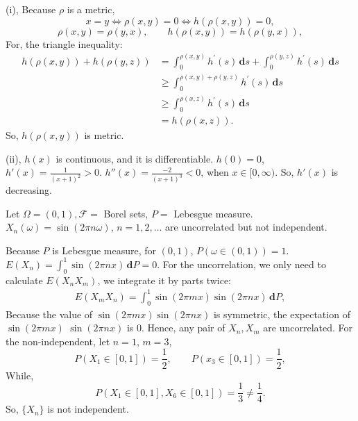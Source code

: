 \documentclass[en, normal, 11pt, black]{elegantnote}
\newenvironment{exercise}[1]{\begin{tcolorbox}[colback=black!15, colframe=black!80, breakable, title=#1]}{\end{tcolorbox}}
\renewenvironment{proof}{\begin{tcolorbox}[colback=white, colframe=black!50, breakable, title=Proof. ]\setlength{\parskip}{0.8em}}{\,\\\rightline{$\square$}\end{tcolorbox}}
\newcommand{\der}{\,\mathbf{d}}
\begin{document}
    \begin{proof}
        (i), Because $\rho$ is a metric, 
        \[
            x=y\Leftrightarrow\rho(x,y)=0\Leftrightarrow h(\rho(x,y))=0, 
        \]
        \[\rho(x,y)=\rho(y,x),\qquad h(\rho(x,y))=h(\rho(y,x)), \]
        For, the triangle inequality: 
        \[
            \begin{aligned}
            h(\rho(x, y))+h(\rho(y, z)) &=\int_{0}^{\rho(x, y)} h^{\prime}(s) \der s+\int_{0}^{\rho(y, z)} h^{\prime}(s) \der s \\
            & \geqslant \int_{0}^{\rho(x, y)+\rho(y, z)} h^{\prime}(s) \der s \\
            & \geqslant \int_{0}^{\rho(x, z)} h^{\prime}(s) \der s\\
            &=h(\rho(x, z)). 
            \end{aligned}
        \]
        So, $h(\rho(x,y))$ is metric. 

        (ii), $h(x)$ is continuous, and it is differentiable. $h(0)=0$, $h'(x)=\frac{1}{(x+1)^2}>0$. $h''(x)=\frac{-2}{(x+1)^3}<0$, when $x\in[0,\infty)$. So, $h'(x)$ is decreasing. 
    \end{proof}

    \begin{exercise}{2.1.4}
        Let $\Omega=(0,1), \mathcal{F}=$ Borel sets, $P=$ Lebesgue measure. $X_{n}(\omega)=\sin (2 \pi n \omega)$, $n=1,2, \ldots$ are uncorrelated but not independent. 
    \end{exercise}

    \begin{proof}
        Because $P$ is Lebesgue measure, for $(0,1)$, $P(\omega\in(0,1))=1$. $E(X_n)=\int_0^1\sin(2\pi n x)\der P=0$. 
        For the uncorrelation, we only need to calculate $E(X_nX_m)$, we integrate it by parts twice: 
        \[
            \begin{aligned}
                E (X_{m} X_{n})=\int_{0}^{1} \sin (2 \pi m x) \sin (2 \pi n x) \der P, 
            \end{aligned}
        \]
        Because the value of $\sin (2 \pi m x) \sin (2 \pi n x)$ is symmetric, the expectation of $\sin (2 \pi m x)$ $\sin (2 \pi n x)$ is $0$. Hence, any pair of $X_n,X_m$ are uncorrelated. For the non-independent, let $n=1$, $m=3$, 
        \[P(X_1\in[0,1])=\frac{1}{2},\qquad P(x_3\in[0,1])=\frac{1}{2}, \]
        While, 
        \[P(X_1\in[0,1], X_6\in[0,1])=\frac{1}{3}\not=\frac{1}{4}. \]
        So, $\{X_n\}$ is not independent. 
    \end{proof}
\end{document}
